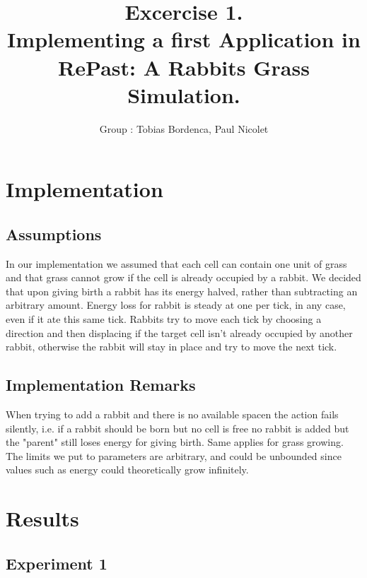 \documentclass[11pt]{article}
\title{\bf Excercise 1.\\ Implementing a first Application in RePast: A Rabbits Grass Simulation.}
\author{Group \textnumero 1: Tobias Bordenca, Paul Nicolet}
\begin{document}
\maketitle

\section{Implementation}

\subsection{Assumptions}
In our implementation we assumed that each cell can contain one unit of grass and that grass cannot grow if the cell is already occupied by a rabbit. We decided that upon giving birth a rabbit has its energy halved, rather than subtracting an arbitrary amount. Energy loss for rabbit is steady at one per tick, in any case, even if it ate this same tick. Rabbits try to move each tick by choosing a direction and then displacing if the target cell isn't already occupied by another rabbit, otherwise the rabbit will stay in place and try to move the next tick.

\subsection{Implementation Remarks}
When trying to add a rabbit and there is no available spacen the action fails silently, i.e. if a rabbit should be born but no cell is free no rabbit is added but the "parent" still loses energy for giving birth. Same applies for grass growing. \\
The limits we put to parameters are arbitrary, and could be unbounded since values such as energy could theoretically grow infinitely.

\section{Results}


\subsection{Experiment 1}
\end{document}
